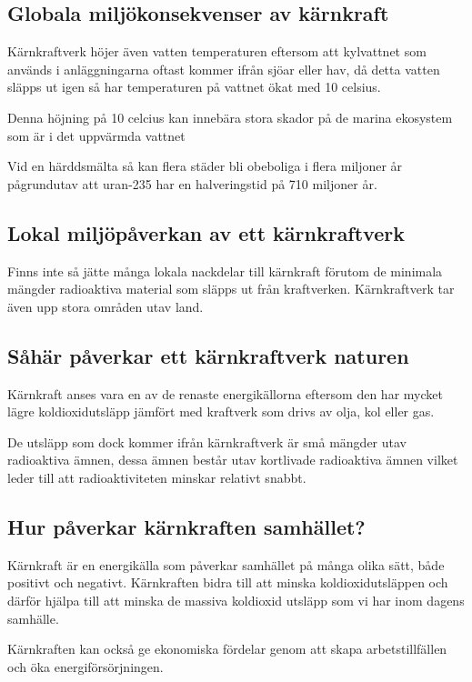 \documentclass[11p]{article}
\begin{document}
    \subsection{Globala miljökonsekvenser av kärnkraft}
    Kärnkraftverk höjer även vatten temperaturen eftersom att kylvattnet som används i anläggningarna oftast kommer ifrån sjöar eller hav, då detta vatten släpps ut igen så har temperaturen på vattnet ökat med 10 celsius.
    \parencite{Naturvårdsverket}

    Denna höjning på 10 celcius kan innebära stora skador på de marina ekosystem som är i det uppvärmda vattnet  \textcite{Energiforsk}


    Vid en härddsmälta så kan flera städer bli obeboliga i flera miljoner år pågrundutav att uran-235 har en halveringstid på 710 miljoner år. \textcite{Strålsäkerhetsmyndigheten2}


    \subsection{Lokal miljöpåverkan av ett kärnkraftverk}
    Finns inte så jätte många lokala nackdelar till kärnkraft förutom de minimala mängder radioaktiva material som släpps ut från kraftverken. Kärnkraftverk tar även upp stora områden utav land.
    \subsection{Såhär påverkar ett kärnkraftverk naturen}
    Kärnkraft anses vara en av de renaste energikällorna eftersom den har mycket lägre koldioxidutsläpp jämfört med kraftverk som drivs av olja, kol eller gas.


    De utsläpp som dock kommer ifrån kärnkraftverk är små mängder utav radioaktiva ämnen, dessa ämnen består utav kortlivade radioaktiva ämnen vilket leder till att radioaktiviteten minskar relativt snabbt. \parencite{Naturvårdsverket}

    \subsection{Hur påverkar kärnkraften samhället?}
    Kärnkraft är en energikälla som påverkar samhället på många olika sätt, både positivt och negativt. Kärnkraften bidra till att minska koldioxidutsläppen och därför hjälpa till att minska de massiva koldioxid utsläpp som vi har inom dagens samhälle.

    Kärnkraften kan också ge ekonomiska fördelar genom att skapa arbetstillfällen och öka energiförsörjningen.
\end{document}
